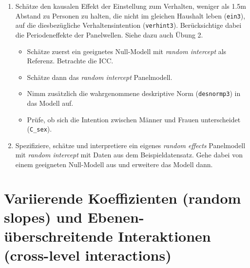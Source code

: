 \documentclass[
]{book}
\providecommand{\tightlist}{%
  \setlength{\itemsep}{0pt}\setlength{\parskip}{0pt}}
\begin{document}
\begin{enumerate}
\def\labelenumi{\arabic{enumi})}
\tightlist
\item
  Schätze den kausalen Effekt der Einstellung zum Verhalten, weniger als 1.5m Abstand zu Personen zu halten, die nicht im gleichen Haushalt leben (\texttt{ein3}), auf die diesbezügliche Verhaltensintention (\texttt{verhint3}). Berücksichtige dabei die Periodeneffekte der Panelwellen. Siehe dazu auch Übung 2.

  \begin{itemize}
  \tightlist
  \item
    Schätze zuerst ein geeignetes Null-Modell mit \emph{random intercept} als Referenz. Betrachte die ICC.
  \item
    Schätze dann das \emph{random intercept} Panelmodell.
  \item
    Nimm zusätzlich die wahrgenommene deskriptive Norm (\texttt{desnormp3}) in das Modell auf.
  \item
    Prüfe, ob sich die Intention zwischen Männer und Frauen unterscheidet (\texttt{C\_sex}).
  \end{itemize}
\item
  Spezifiziere, schätze und interpretiere ein eigenes \emph{random effects} Panelmodell mit \emph{random intercept} mit Daten aus dem Beispieldatensatz. Gehe dabei von einem geeigneten Null-Modell aus und erweitere das Modell dann.
\end{enumerate}

\hypertarget{variierende-koeffizienten-random-slopes-und-ebenen-uxfcberschreitende-interaktionen-cross-level-interactions}{%
\section{Variierende Koeffizienten (random slopes) und Ebenen-überschreitende Interaktionen (cross-level interactions)}\label{variierende-koeffizienten-random-slopes-und-ebenen-uxfcberschreitende-interaktionen-cross-level-interactions}}
\end{document}
